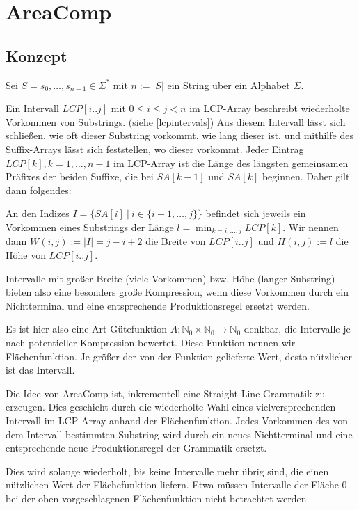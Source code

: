 \chapter{AreaComp}

\section{Konzept}

Sei $S = s_0, \dots, s_{n-1} \in \Sigma^*$ mit $n := |S|$ ein String über ein Alphabet $\Sigma$.

Ein Intervall $LCP[i..j]$ mit $0 \leq i \leq j < n$ im LCP-Array beschreibt wiederholte Vorkommen von Substrings. (siehe \autoref{lcpintervals}) Aus diesem Intervall lässt sich schließen, wie oft dieser Substring vorkommt, wie lang dieser ist, und mithilfe des Suffix-Arrays lässt sich feststellen, wo dieser vorkommt. Jeder Eintrag $LCP[k], k = 1,\dots,n-1$ im LCP-Array ist die Länge des längsten gemeinsamen Präfixes der beiden Suffixe, die bei $SA[k-1]$ und $SA[k]$ beginnen. Daher gilt dann folgendes:

An den Indizes $I = \{SA[i]\ |\ i \in \{i-1, \dots, j\}\}$ befindet sich jeweils ein Vorkommen eines Substrings der Länge $l = \min_{k = i, \dots, j} LCP[k]$. Wir nennen dann $W(i, j) := |I| = j - i + 2$ die Breite von $LCP[i..j]$ und $H(i, j) := l$ die Höhe von $LCP[i..j]$.

Intervalle mit großer Breite (viele Vorkommen) bzw. Höhe (langer Substring) bieten also eine besonders große Kompression, wenn diese Vorkommen durch ein Nichtterminal und eine entsprechende Produktionsregel ersetzt werden.

Es ist hier also eine Art Gütefunktion $A: \mathbb{N}_0 \times \mathbb{N}_0 \rightarrow \mathbb{N}_0$ denkbar, die Intervalle je nach potentieller Kompression bewertet. Diese Funktion nennen wir Flächenfunktion. Je größer der von der Funktion gelieferte Wert, desto nützlicher ist das Intervall.

Die Idee von AreaComp ist, inkrementell eine Straight-Line-Grammatik zu erzeugen. Dies geschieht durch die wiederholte Wahl eines vielversprechenden Intervall im LCP-Array anhand der Flächenfunktion. Jedes Vorkommen des von dem Intervall bestimmten Substring wird durch ein neues Nichtterminal und eine entsprechende neue Produktionsregel der Grammatik ersetzt.

Dies wird solange wiederholt, bis keine Intervalle mehr übrig sind, die einen nützlichen Wert der Flächefunktion liefern. Etwa müssen Intervalle der Fläche $0$ bei der oben vorgeschlagenen Flächenfunktion nicht betrachtet werden.

